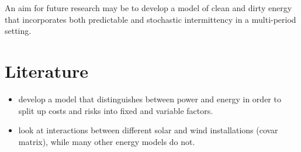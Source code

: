 \documentclass[11pt,a4paper]{extarticle}
\begin{document}
An aim for future research may be to develop a model of clean and dirty energy that incorporates both predictable and stochastic intermittency in a multi-period setting. 



\pagebreak



\section{Literature}

\begin{itemize}
	\item \cite{Delarue} develop a model that distinguishes between power and energy in order to split up costs and risks into fixed and variable factors. 
	\item \cite{SB2018} look at interactions between different solar and wind installations (covar matrix), while many other energy models do not.
\end{itemize}
\end{document}
